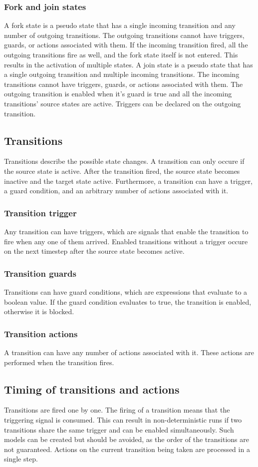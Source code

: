     \subsubsection{Fork and join states}
A fork state is a pseudo state that has a single incoming transition and any number of outgoing transitions. The outgoing transitions cannot have triggers, guards, or actions associated with them. If the incoming transition fired, all the outgoing transitions fire as well, and the fork state itself is not entered. This results in the activation of multiple states.
A join state is a pseudo state that has a single outgoing transition and multiple incoming transitions. The incoming transitions cannot have triggers, guards, or actions associated with them. The outgoing transition is enabled when it's guard is true and all the incoming transitions' source states are active. Triggers can be declared on the outgoing transition.
  \subsection{Transitions}
Transitions describe the possible state changes. A transition can only occure if the source state is active. After the transition fired, the source state becomes inactive and the target state active. Furthermore, a transition can have a trigger, a guard condition, and an arbitrary number of actions associated with it.
    \subsubsection{Transition trigger}
Any transition can have triggers, which are signals that enable the transition to fire when any one of them arrived. Enabled transitions without a trigger occure on the next timestep after the source state becomes active.
    \subsubsection{Transition guards}
Transitions can have guard conditions, which are expressions that evaluate to a boolean value. If the guard condition evaluates to true, the transition is enabled, otherwise it is blocked.
    \subsubsection{Transition actions}
A transition can have any number of actions associated with it. These actions are performed when the transition fires.
  \subsection{Timing of transitions and actions}
Transitions are fired one by one. The firing of a transition means that the triggering signal is consumed. This can result in non-deterministic runs if two transitions share the same trigger and can be enabled simultaneously. Such models can be created but should be avoided, as the order of the transitions are not guaranteed. Actions on the current transition being taken are processed in a single step.
